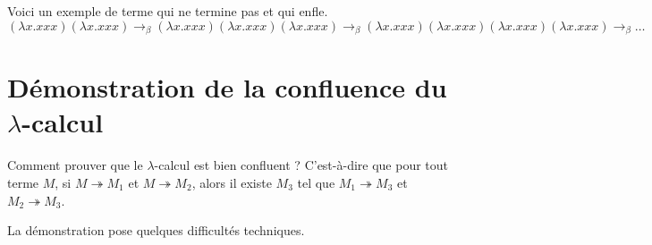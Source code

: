 \documentclass[11pt]{book}
\begin{document}
\vspace{1cm}
Voici un exemple de terme qui ne termine pas et qui enfle.
$$ (\lambda x.xxx)(\lambda x.xxx) \rightarrow _\beta (\lambda x.xxx)(\lambda x.xxx)(\lambda x.xxx)
\rightarrow _\beta (\lambda x.xxx)(\lambda x.xxx)(\lambda x.xxx)(\lambda x.xxx) \rightarrow _\beta \ldots
$$  

\section{Démonstration de la confluence du $\lambda$-calcul}
Comment prouver que le $\lambda$-calcul est bien confluent ? C'est-à-dire que pour tout terme $M$, si $M\twoheadrightarrow M_1$ et
  $ M\twoheadrightarrow M_2 $,
alors il existe $M_3$ tel que $M_1\twoheadrightarrow M_3$ et  $M_2\twoheadrightarrow  M_3$.

La démonstration pose quelques difficultés techniques.
\end{document}
